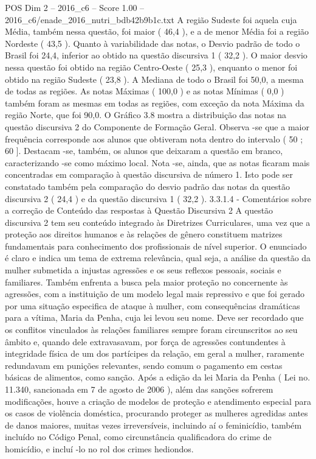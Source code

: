 \begin{textsample}{POS Dim 2 – 2016\_c6 – Score 1.00 – 2016\_c6/enade\_2016\_nutri\_bdb42b9b1c.txt}
A região Sudeste foi aquela cuja Média, também nessa questão, foi maior ( 46,4 ), e a de menor Média foi a região Nordeste ( 43,5 ).
Quanto à variabilidade das notas, o Desvio padrão de todo o Brasil foi 24,4, inferior ao obtido na questão discursiva 1 ( 32,2 ).
O maior desvio nessa questão foi obtido na região Centro-Oeste ( 25,3 ), enquanto o menor foi obtido na região Sudeste ( 23,8 ).
A Mediana de todo o Brasil foi 50,0, a mesma de todas as regiões.
As notas Máximas ( 100,0 ) e as notas Mínimas ( 0,0 ) também foram as mesmas em todas as regiões, com exceção da nota Máxima da região Norte, que foi 90,0.
O Gráfico 3.8 mostra a distribuição das notas na questão discursiva 2 do Componente de Formação Geral.
Observa -se que a maior frequência corresponde aos alunos que obtiveram nota dentro do intervalo ( 50 ; 60 ].
Destacam -se, também, os alunos que deixaram a questão em branco, caracterizando -se como máximo local.
Nota -se, ainda, que as notas ficaram mais concentradas em comparação à questão discursiva de número 1.
Isto pode ser constatado também pela comparação do desvio padrão das notas da questão discursiva 2 ( 24,4 ) e da questão discursiva 1 ( 32,2 ). 3.3.1.4 - Comentários sobre a correção de Conteúdo das respostas à Questão Discursiva 2 A questão discursiva 2 tem seu conteúdo integrado às Diretrizes Curriculares, uma vez que a proteção aos direitos humanos e às relações de gênero constituem matrizes fundamentais para conhecimento dos profissionais de nível superior.
O enunciado é claro e indica um tema de extrema relevância, qual seja, a análise da questão da mulher submetida a injustas agressões e os seus reflexos pessoais, sociais e familiares.
Também enfrenta a busca pela maior proteção no concernente às agressões, com a instituição de um modelo legal mais repressivo e que foi gerado por uma situação especifica de ataque à mulher, com consequências dramáticas para a vítima, Maria da Penha, cuja lei levou seu nome.
Deve ser recordado que os conflitos vinculados às relações familiares sempre foram circunscritos ao seu âmbito e, quando dele extravasavam, por força de agressões contundentes à integridade física de um dos partícipes da relação, em geral a mulher, raramente redundavam em punições relevantes, sendo comum o pagamento em cestas básicas de alimentos, como sanção.
Após a edição da lei Maria da Penha ( Lei no. 11.340, sancionada em 7 de agosto de 2006 ), além das sanções sofrerem modificações, houve a criação de modelos de proteção e atendimento especial para os casos de violência doméstica, procurando proteger as mulheres agredidas antes de danos maiores, muitas vezes irreversíveis, incluindo aí o feminicídio, também incluído no Código Penal, como circunstância qualificadora do crime de homicídio, e incluí -lo no rol dos crimes hediondos.

\end{textsample}
